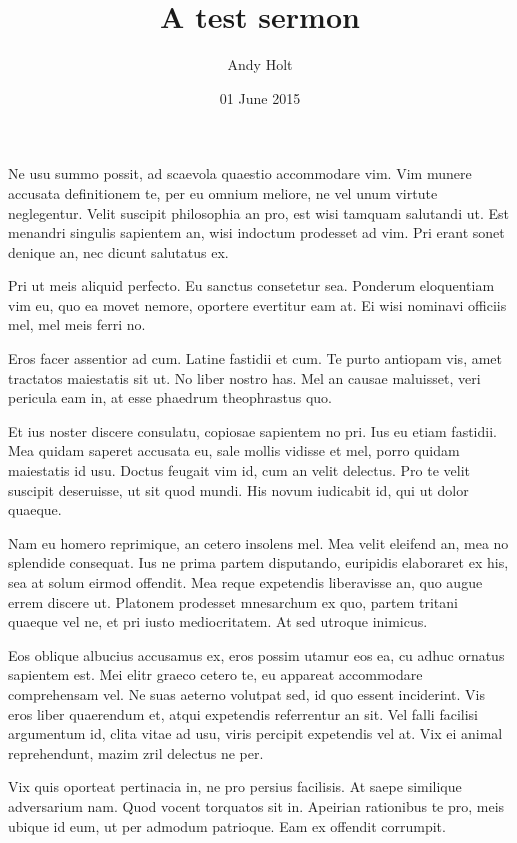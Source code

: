 \documentclass{adhsernotes}
\title{A test sermon}
\author{Andy Holt}
\date{01 June 2015}
\begin{document}
\maketitle

Ne usu summo possit, ad scaevola quaestio accommodare vim. Vim munere accusata
definitionem te, per eu omnium meliore, ne vel unum virtute neglegentur. Velit
suscipit philosophia an pro, est wisi tamquam salutandi ut. Est menandri
singulis sapientem an, wisi indoctum prodesset ad vim. Pri erant sonet denique
an, nec dicunt salutatus ex.

Pri ut meis aliquid perfecto. Eu sanctus consetetur sea. Ponderum eloquentiam
vim eu, quo ea movet nemore, oportere evertitur eam at. Ei wisi nominavi
officiis mel, mel meis ferri no.

Eros facer assentior ad cum. Latine fastidii et cum. Te purto antiopam vis, amet
tractatos maiestatis sit ut. No liber nostro has. Mel an causae maluisset, veri
pericula eam in, at esse phaedrum theophrastus quo.

Et ius noster discere consulatu, copiosae sapientem no pri. Ius eu etiam
fastidii. Mea quidam saperet accusata eu, sale mollis vidisse et mel, porro
quidam maiestatis id usu. Doctus feugait vim id, cum an velit delectus. Pro te
velit suscipit deseruisse, ut sit quod mundi. His novum iudicabit id, qui ut
dolor quaeque.

Nam eu homero reprimique, an cetero insolens mel. Mea velit eleifend an, mea no
splendide consequat. Ius ne prima partem disputando, euripidis elaboraret ex
his, sea at solum eirmod offendit. Mea reque expetendis liberavisse an, quo
augue errem discere ut. Platonem prodesset mnesarchum ex quo, partem tritani
quaeque vel ne, et pri iusto mediocritatem. At sed utroque inimicus.

Eos oblique albucius accusamus ex, eros possim utamur eos ea, cu adhuc ornatus
sapientem est. Mei elitr graeco cetero te, eu appareat accommodare comprehensam
vel. Ne suas aeterno volutpat sed, id quo essent inciderint. Vis eros liber
quaerendum et, atqui expetendis referrentur an sit. Vel falli facilisi
argumentum id, clita vitae ad usu, viris percipit expetendis vel at. Vix ei
animal reprehendunt, mazim zril delectus ne per.

Vix quis oporteat pertinacia in, ne pro persius facilisis. At saepe similique
adversarium nam. Quod vocent torquatos sit in. Apeirian rationibus te pro, meis
ubique id eum, ut per admodum patrioque. Eam ex offendit corrumpit.
\end{document}
